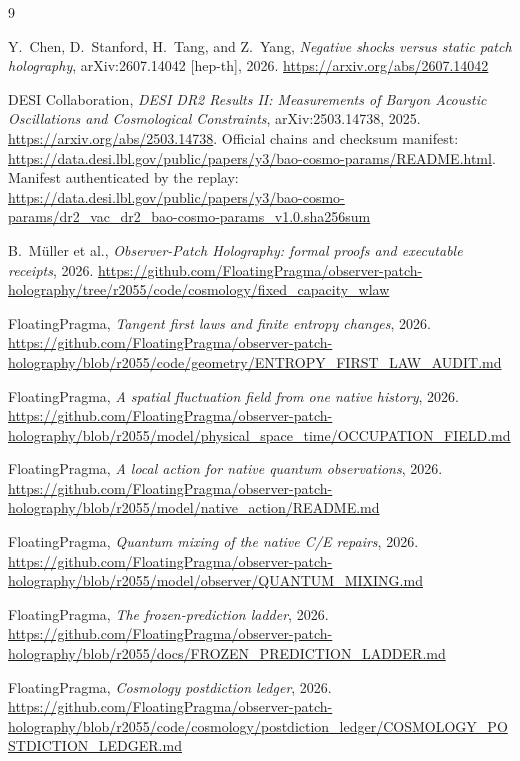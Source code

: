 \documentclass[11pt]{article}
\theoremstyle{remark}
\begin{document}
\begin{thebibliography}{9}

Y.~Chen, D.~Stanford, H.~Tang, and Z.~Yang,
\emph{Negative shocks versus static patch holography},
arXiv:2607.14042 [hep-th], 2026.
\url{https://arxiv.org/abs/2607.14042}

DESI Collaboration,
\emph{DESI DR2 Results II: Measurements of Baryon Acoustic Oscillations and
Cosmological Constraints}, arXiv:2503.14738, 2025.
\url{https://arxiv.org/abs/2503.14738}. Official chains and checksum manifest:
\url{https://data.desi.lbl.gov/public/papers/y3/bao-cosmo-params/README.html}.
Manifest authenticated by the replay:
\url{https://data.desi.lbl.gov/public/papers/y3/bao-cosmo-params/dr2_vac_dr2_bao-cosmo-params_v1.0.sha256sum}

B.\ M\"uller et al.,
\emph{Observer-Patch Holography: formal proofs and executable receipts},
2026.
\url{https://github.com/FloatingPragma/observer-patch-holography/tree/r2055/code/cosmology/fixed_capacity_wlaw}

FloatingPragma,
\emph{Tangent first laws and finite entropy changes}, 2026.
\url{https://github.com/FloatingPragma/observer-patch-holography/blob/r2055/code/geometry/ENTROPY_FIRST_LAW_AUDIT.md}

FloatingPragma,
\emph{A spatial fluctuation field from one native history}, 2026.
\url{https://github.com/FloatingPragma/observer-patch-holography/blob/r2055/model/physical_space_time/OCCUPATION_FIELD.md}

FloatingPragma,
\emph{A local action for native quantum observations}, 2026.
\url{https://github.com/FloatingPragma/observer-patch-holography/blob/r2055/model/native_action/README.md}

FloatingPragma,
\emph{Quantum mixing of the native C/E repairs}, 2026.
\url{https://github.com/FloatingPragma/observer-patch-holography/blob/r2055/model/observer/QUANTUM_MIXING.md}

FloatingPragma,
\emph{The frozen-prediction ladder}, 2026.
\url{https://github.com/FloatingPragma/observer-patch-holography/blob/r2055/docs/FROZEN_PREDICTION_LADDER.md}

FloatingPragma,
\emph{Cosmology postdiction ledger}, 2026.
\url{https://github.com/FloatingPragma/observer-patch-holography/blob/r2055/code/cosmology/postdiction_ledger/COSMOLOGY_POSTDICTION_LEDGER.md}


\end{thebibliography}
\end{document}
